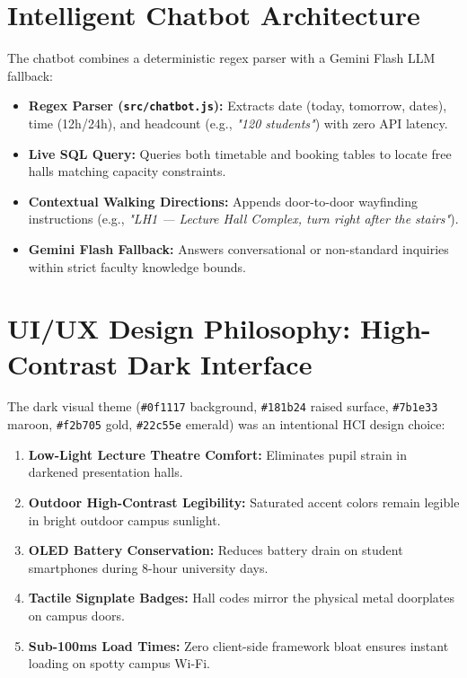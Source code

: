 \documentclass[11pt,a4paper]{article}
\begin{document}
\section{Intelligent Chatbot Architecture}
The chatbot combines a deterministic regex parser with a Gemini Flash LLM fallback:
\begin{itemize}
    \item \textbf{Regex Parser (\texttt{src/chatbot.js}):} Extracts date (today, tomorrow, dates), time (12h/24h), and headcount (e.g., \textit{"120 students"}) with zero API latency.
    \item \textbf{Live SQL Query:} Queries both timetable and booking tables to locate free halls matching capacity constraints.
    \item \textbf{Contextual Walking Directions:} Appends door-to-door wayfinding instructions (e.g., \textit{"LH1 — Lecture Hall Complex, turn right after the stairs"}).
    \item \textbf{Gemini Flash Fallback:} Answers conversational or non-standard inquiries within strict faculty knowledge bounds.
\end{itemize}

\section{UI/UX Design Philosophy: High-Contrast Dark Interface}
The dark visual theme (\texttt{\#0f1117} background, \texttt{\#181b24} raised surface, \texttt{\#7b1e33} maroon, \texttt{\#f2b705} gold, \texttt{\#22c55e} emerald) was an intentional HCI design choice:
\begin{enumerate}
    \item \textbf{Low-Light Lecture Theatre Comfort:} Eliminates pupil strain in darkened presentation halls.
    \item \textbf{Outdoor High-Contrast Legibility:} Saturated accent colors remain legible in bright outdoor campus sunlight.
    \item \textbf{OLED Battery Conservation:} Reduces battery drain on student smartphones during 8-hour university days.
    \item \textbf{Tactile Signplate Badges:} Hall codes mirror the physical metal doorplates on campus doors.
    \item \textbf{Sub-100ms Load Times:} Zero client-side framework bloat ensures instant loading on spotty campus Wi-Fi.
\end{enumerate}
\end{document}
